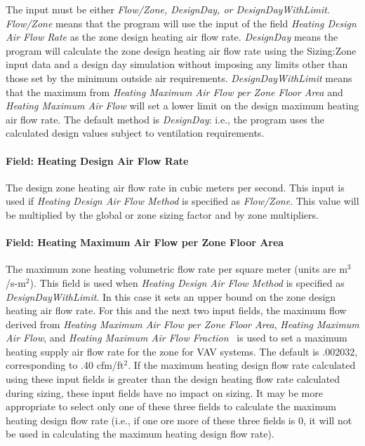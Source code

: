 The input must be either \emph{Flow/Zone, DesignDay, or DesignDayWithLimit}. \emph{Flow/Zone} means that the program will use the input of the field \emph{Heating Design Air Flow Rate} as the zone design heating air flow rate. \emph{DesignDay} means the program will calculate the zone design heating air flow rate using the Sizing:Zone input data and a design day simulation without imposing any limits other than those set by the minimum outside air requirements. \emph{DesignDayWithLimit} means that the maximum from \emph{Heating Maximum Air Flow per Zone Floor Area} and \emph{Heating Maximum Air Flow} will set a lower limit on the design maximum heating air flow rate. The default method is \emph{DesignDay}: i.e., the program uses the calculated design values subject to ventilation requirements.

\paragraph{Field: Heating Design Air Flow Rate}\label{field-heating-design-air-flow-rate}

The design zone heating air flow rate in cubic meters per second. This input is used if \emph{Heating Design Air Flow Method} is specified as \emph{Flow/Zone}. This value will be multiplied by the global or zone sizing factor and by zone multipliers.

\paragraph{Field: Heating Maximum Air Flow per Zone Floor Area}\label{field-heating-maximum-air-flow-per-zone-floor-area}

The maximum zone heating volumetric flow rate per square meter (units are m\(^{3}\)/s-m\(^{2}\)). This field is used when \emph{Heating Design Air Flow Method} is specified as \emph{DesignDayWithLimit}. In this case it sets an upper bound on the zone design heating air flow rate. For this and the next two input fields, the maximum flow derived from \emph{Heating Maximum Air Flow per Zone Floor Area}, \emph{Heating Maximum Air Flow}, and \emph{Heating Maximum Air Flow Fraction}~ is used to set a maximum heating supply air flow rate for the zone for VAV systems. The default is .002032, corresponding to .40 cfm/ft\(^{2}\). If the maximum heating design flow rate calculated using these input fields is greater than the design heating flow rate calculated during sizing, these input fields have no impact on sizing. It may be more appropriate to select only one of these three fields to calculate the maximum heating design flow rate (i.e., if one ore more of these three fields is 0, it will not be used in calculating the maximum heating design flow rate).

